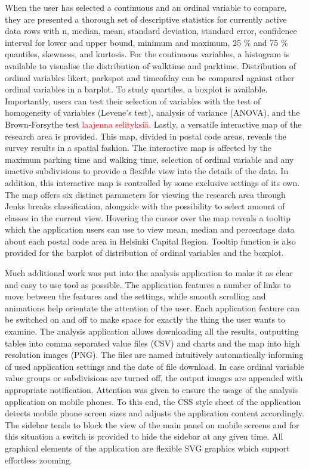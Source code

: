 When the user has selected a continuous and an ordinal variable to compare, they are presented a thorough set of descriptive statistics for currently active data rows with n, median, mean, standard deviation, standard error, confidence interval for lower and upper bound, minimum and maximum, 25 \% and 75 \% quantiles, skewness, and kurtosis. For the continuous variables, a histogram is available to visualise the distribution of walktime and parktime. Distribution of ordinal variables likert, parkspot and timeofday can be compared against other ordinal variables in a barplot. To study quartiles, a boxplot is available. Importantly, users can test their selection of variables with the test of homogeneity of variables (Levene's test), analysis of variance (ANOVA), and the Brown-Forsythe test \textcolor{red}{laajenna selityksiä}. Lastly, a versatile interactive map of the research area is provided. This map, divided in postal code areas, reveals the survey results in a spatial fashion. The interactive map is affected by the maximum parking time and walking time, selection of ordinal variable and any inactive subdivisions to provide a flexible view into the details of the data. In addition, this interactive map is controlled by some exclusive settings of its own. The map offers six distinct parameters for viewing the research area through Jenks breaks classification, alongside with the possibility to select amount of classes in the current view. Hovering the cursor over the map reveals a tooltip which the application users can use to view mean, median and percentage data about each postal code area in Helsinki Capital Region. Tooltip function is also provided for the barplot of distribution of ordinal variables and the boxplot.

Much additional work was put into the analysis application to make it as clear and easy to use tool as possible. The application features a number of links to move between the features and the settings, while smooth scrolling and animations help orientate the attention of the user. Each application feature can be switched on and off to make space for exactly the thing the user wants to examine. The analysis application allows downloading all the results, outputting tables into comma separated value files (CSV) and charts and the map into high resolution images (PNG). The files are named intuitively automatically informing of used application settings and the date of file download. In case ordinal variable value groups or subdivisions are turned off, the output images are appended with appropriate notification. Attention was given to ensure the usage of the analysis application on mobile phones. To this end, the CSS style sheet of the application detects mobile phone screen sizes and adjusts the application content accordingly. The sidebar tends to block the view of the main panel on mobile screens and for this situation a switch is provided to hide the sidebar at any given time. All graphical elements of the application are flexible SVG graphics which support effortless zooming.

